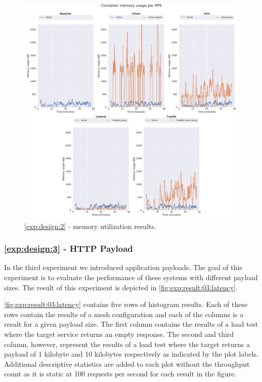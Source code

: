 \begin{figure}[h]
    \centering
    
    \includegraphics[width=\linewidth]{5_experimental_evaluation/figures/exp_02-mem-results.pdf}

    \caption{\ref{exp:design:2} - memory utilization results.}
    
    \label{fig:exp:result:02:memory}
\end{figure}



\subsubsection{\ref{exp:design:3} - HTTP Payload}
\label{sec:experiments:results:per-experiment:03}

In the third experiment we introduced application payloads. The goal of this experiment is to evaluate the performance of these systems with different payload sizes. The result of this experiment is depicted in \cref{fig:exp:result:03:latency}.

\cref{fig:exp:result:03:latency} contains five rows of histogram results. Each of these rows contain the results of a mesh configuration and each of the columns is a result for a given payload size. The first column contains the results of a load test where the target service returns an empty response. The second and third column, however, represent the results of a load test where the target returns a payload of 1 kilobyte and 10 kilobytes respectively as indicated by the plot labels. Additional descriptive statistics are added to each plot without the throughput count as it is static at 100 requests per second for each result in the figure.


